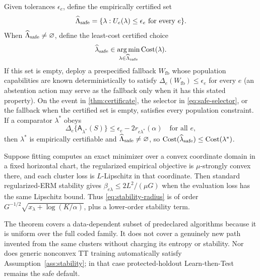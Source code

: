 Given tolerances \(\epsilon_e\), define the empirically certified set
\[
 \widehat\Lambda_{\mathrm{safe}}
 =\{\lambda:U_e(\lambda)\le\epsilon_e\ \text{for every }e\}.
\]
When \(\widehat\Lambda_{\mathrm{safe}}\ne\varnothing\), define the least-cost
certified choice
\begin{equation}
 \widehat\lambda_{\mathrm{safe}}
 \in\operatorname*{arg\,min}_{\lambda\in\widehat\Lambda_{\mathrm{safe}}}
 \operatorname{Cost}(\lambda).
\label{eq:safe-selector}
\end{equation}
If this set is empty, deploy a prespecified fallback \(W_{\mathrm{fb}}\) whose
population capabilities are known deterministically to satisfy
\(\Delta_e(W_{\mathrm{fb}})\le\epsilon_e\) for every \(e\) (an abstention action
may serve as the fallback only when it has this stated property). On the event
in \cref{thm:certificate}, the selector in \cref{eq:safe-selector}, or the
fallback when the certified set is empty, satisfies every population
constraint. If a comparator \(\lambda^*\) obeys
\[
\Delta_e\{\mathsf A_{\lambda^*}(S)\}
\le\epsilon_e-2r_{e\lambda^*}(\alpha)
\quad\text{for all }e,
\]
then \(\lambda^*\) is empirically certifiable and
\(\widehat\Lambda_{\mathrm{safe}}\ne\varnothing\), so
\(\operatorname{Cost}(\widehat\lambda_{\mathrm{safe}})
\le\operatorname{Cost}(\lambda^*)\).

\begin{corollary}
\label{cor:strong-convex-stability}
Suppose fitting computes an exact minimizer over a convex coordinate domain in a fixed horizontal chart, the regularized empirical objective is \(\mu\)-strongly convex there, and each cluster loss is \(L\)-Lipschitz in that coordinate. Then standard regularized-ERM stability gives \(\beta_{e\lambda}\le 2L^2/(\mu G)\) when the evaluation loss has the same Lipschitz bound. Thus \cref{eq:stability-radius} is of order
\(G^{-1/2}\sqrt{x_\lambda+\log(K/\alpha)}\), plus a lower-order stability term.
\end{corollary}

The theorem covers a data-dependent subset of predeclared algorithms because it is uniform over the full coded family. It does not cover a genuinely new path invented from the same clusters without charging its entropy or stability. Nor does generic nonconvex TT training automatically satisfy Assumption~\ref{ass:stability}; in that case protected-holdout Learn-then-Test remains the safe default.
